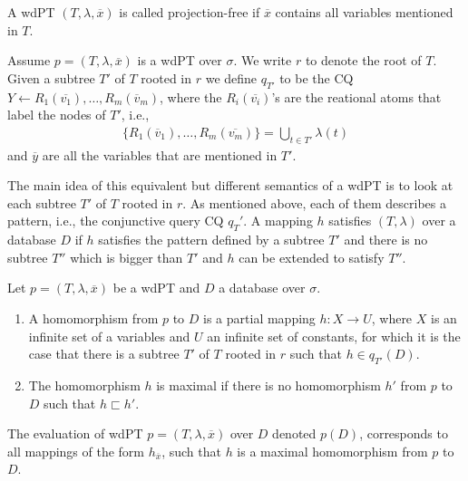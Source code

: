 \begin{definition}
	A wdPT $(T,\lambda, \overline{x})$ is called projection-free if $\overline{x}$
	contains all variables mentioned in $T$.
\end{definition}

\begin{definition}\label{wdptq}
	Assume $p = (T,\lambda,\overline{x})$ is a wdPT over $\sigma$. We write $r$ to
	denote the root of $T$. Given a subtree $T'$ of $T$ rooted in $r$ we define
	$q_{T'}$ to be the CQ $Y \leftarrow R_1(\overline{v_1}), \dots,
	R_m(\overline{v}_m)$, where the $R_i(\overline{v_i})$'s are the reational atoms
	that label the nodes of $T'$, i.e., 
	\begin{align*}
		\{ R_1(\overline{v}_1), \dots, R_m(\overline{v_m}) \} = \bigcup_{t \in T'} \lambda(t) 
	\end{align*} and $\overline{y}$ are all the variables that are mentioned in
	$T'$. 
\end{definition}

The main idea of this equivalent but different semantics of a wdPT is to look at each subtree $T'$ of
$T$ rooted in $r$. As mentioned above, each of them describes a pattern, i.e.,
the conjunctive query CQ $q_T'$. A mapping $h$ satisfies $(T,\lambda)$ over
a database $D$ if $h$ satisfies the pattern defined by a subtree $T'$ and there
is no subtree $T''$ which is bigger than $T'$ and $h$ can be extended to satisfy
$T''$.
\begin{definition}
	Let $p=(T,\lambda,\overline{x})$ be a wdPT and $D$ a database over $\sigma$.

	\begin{enumerate}
		\item A homomorphism from $p$ to $D$ is a partial mapping $h: X \rightarrow U$,
			where $X$ is an infinite set of a variables and $U$ an infinite set of
			constants, for which it is the case that there is a subtree $T'$ of $T$ rooted
			in $r$ such that $h \in q_{T'}(D)$.
		\item The homomorphism $h$ is maximal if there is no homomorphism $h'$ from $p$
			to $D$ such that $h \sqsubset h'$.
	\end{enumerate}
	The evaluation of wdPT $p = (T,\lambda,\overline{x})$ over $D$ denoted $p(D)$,
	corresponds to all mappings of the form $h_{\overline{x}}$, such that $h$ is a
	maximal homomorphism from $p$ to $D$.
\end{definition}

